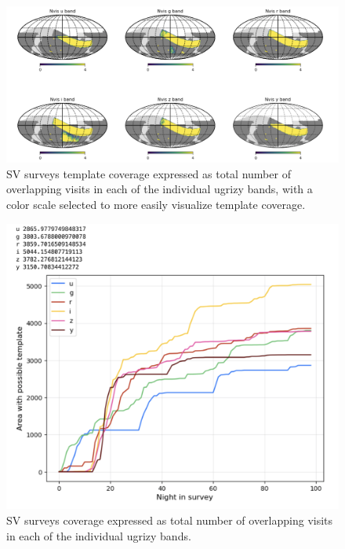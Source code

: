 \begin{figure}[htbp]
    \begin{center}
    \includegraphics[width=1\textwidth]{./sv_surveys_template_coverage.png}
    \caption{SV surveys template coverage expressed as total number of overlapping visits in each of the individual ugrizy bands, with a color scale selected to more easily visualize template coverage.}
    \label{sv_surveys_template_coverage}
    \end{center}
\end{figure}

\begin{figure}[htbp]
    \begin{center}
    \includegraphics[width=1\textwidth]{./sv_surveys_cumulative_template_area.png}
    \caption{SV surveys coverage expressed as total number of overlapping visits in each of the individual ugrizy bands.}
    \label{sv_surveys_cumulative_template_area}
    \end{center}
\end{figure}

